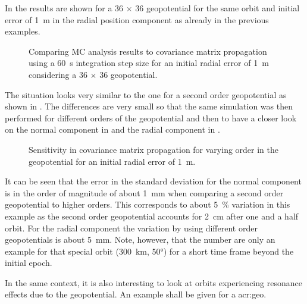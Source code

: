 In  the results are shown for a 36 $\times$ 36 geopotential for the same orbit and initial error of \SI{1}{\metre} in the radial position component as already in the previous examples.
\begin{figure}[h!]
  \centering
  \hspace{1cm}
  \caption{Comparing MC analysis results to \neptune{} covariance matrix propagation using a \SI{60}{\second} integration step size for an initial radial error of \SI{1}{\metre} considering a 36 $\times$ 36 geopotential. \label{fig:val-cov-scen3-01}}
\end{figure}
The situation looks very similar to the one for a second order geopotential as shown in . The differences are very small so that the 
same simulation was then performed for different orders of the geopotential and then to have a closer look on the normal component in 
 and the radial component in .
\begin{figure}[h!]
  \centering
  \hspace{1cm}
  \caption{Sensitivity in covariance matrix propagation for varying order in the geopotential for an initial radial error of \SI{1}{\metre}. \label{fig:val-cov-scen3-02}}
\end{figure}
It can be seen that the error in the standard deviation for the normal component is in the order of magnitude of about \SI{1}{\milli\metre} when comparing a second order 
geopotential to higher orders. This corresponds to about \SI{5}{\percent} variation in this example as the second order geopotential accounts for \SI{2}{\centi\metre} after one and a half orbit. For the radial component the variation by using different order geopotentials is about \SI{5}{\milli\metre}. Note, however, that the number are only an example for that special orbit (\SI{300}{\kilo\metre}, \ang{50;;}) for a short time frame beyond the initial epoch.

In the same context, it is also interesting to look at orbits experiencing resonance effects due to the geopotential. An example shall be given for a \gls{acr:geo}.

